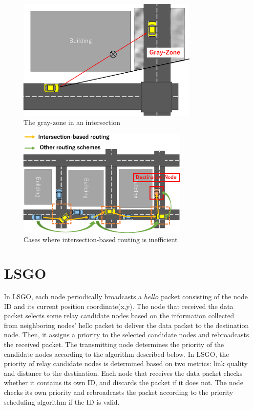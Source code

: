 \documentclass[conference]{IEEEtran}
\begin{document}
\begin{figure}[!ht]
\centering
\includegraphics[width=90mm]{figures/Gray-Zone.eps}
\caption{The gray-zone in an intersection }
\label{fig:Gray-Zone}
\end{figure}


\begin{figure}[!ht]
\centering
\includegraphics[width=85mm]{figures/intersection_routing.eps}
\caption{Cases where intersection-based routing is inefficient}
\label{fig:intersection_routing}
\end{figure}



\section{LSGO}
\label{LSGO}

In LSGO, each node periodically broadcasts a $hello$ packet consisting of the node ID and its current position coordinate(x,y). 
The node that received the data packet  selects some relay candidate nodes based on the  information collected from neighboring nodes' hello packet  to deliver the data packet to the destination node. 
Then, it assigns a priority to the selected candidate nodes and rebroadcasts the received packet. 
The transmitting node  determines the priority of the candidate nodes according to  the algorithm described below. 
In LSGO, the priority of relay candidate nodes is determined based on two metrics: link quality and distance to the destination. 
Each node that receives the data packet checks whether it contains its own ID, and discards the packet if it does not.
The node checks its own priority and rebroadcasts the packet according to the priority scheduling algorithm if the ID  is valid.
\end{document}
